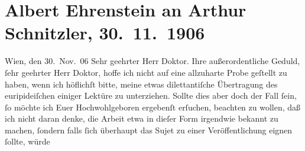 

         
         \renewcommand{\erwaehntePersonen}{Personen: Albert Ehrenstein,  Euripides}
         \renewcommand{\erwaehnteOrte}{Orte: Wien}
         \renewcommand{\erwaehnteWerke}{Werke: Helena}
               \section[Albert Ehrenstein an Arthur Schnitzler, 30. 11. 1906]{ Albert Ehrenstein an Arthur Schnitzler, 30. 11. 1906}\nopagebreak{}\rehead{ }\begin{ledgroupsized}[t]{13cm}\normalsize\beginnumbering{} \toendnotes[C]{\smallbreak\pagebreak[2]} 
\toendnotes[C]{\smallbreak}\pstart
           \raggedleft{}{\pb}Wien, den 30. Nov. 06\pend
           \pstart{}Sehr geehrter Herr Doktor.\pend\pstart
           Ihre außerordentliche Geduld, ſehr geehrter Herr Doktor, hoffe ich nicht auf eine
               allzuharte Probe geſtellt zu haben, wenn ich höflichſt bitte, meine etwas
               dilettantiſche Übertragung des euripideiſchen\label{K_L01640-1v}\label{K_L01640-1h} einiger Lektüre zu
               unterziehen. Sollte dies aber doch der Fall ſein, ſo möchte ich Euer Hochwohlgeboren
               ergebenſt erſuchen, beachten zu wollen, daß ich nicht daran denke, die Arbeit etwa in
               dieſer Form {\pb}irgendwie bekannt zu machen,
               ſondern falls ſich überhaupt das Sujet zu einer Veröffentlichung eignen ſollte, würde

\end{ledgroupsized}
